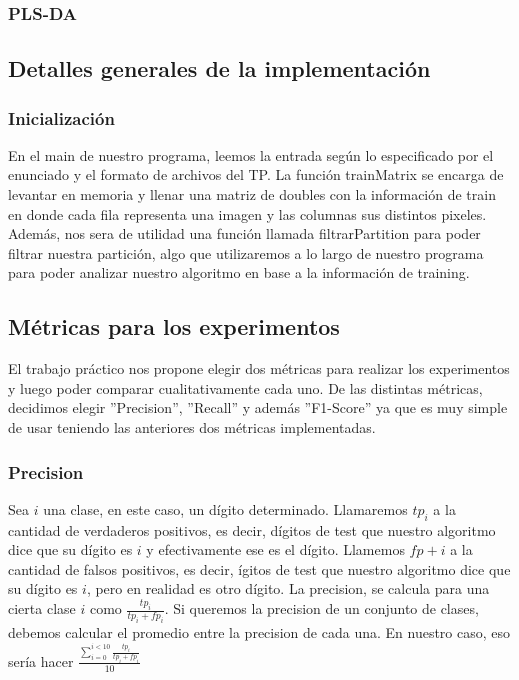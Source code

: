 \subsubsection{PLS-DA}

\subsection{Detalles generales de la implementaci\'on}

\subsubsection{Inicializaci\'on}

En el main de nuestro programa, leemos la entrada seg\'un lo especificado por el enunciado y el formato de archivos del TP. La funci\'on trainMatrix se encarga de levantar en memoria y llenar una matriz de doubles con la informaci\'on de train en donde cada fila representa una imagen y las columnas sus distintos pixeles. Adem\'as, nos sera de utilidad una funci\'on llamada filtrarPartition para poder filtrar nuestra partici\'on, algo que utilizaremos a lo largo de nuestro programa para poder analizar nuestro algoritmo en base a la informaci\'on de training.

\subsection{M\'etricas para los experimentos}

El trabajo pr\'actico nos propone elegir dos m\'etricas para realizar los experimentos y luego poder comparar cualitativamente cada uno. De las distintas m\'etricas, decidimos elegir ''Precision'', ''Recall'' y adem\'as ''F1-Score'' ya que es muy simple de usar teniendo las anteriores dos m\'etricas implementadas.

\subsubsection{Precision}

Sea $i$ una clase, en este caso, un d\'igito determinado. Llamaremos $tp_i$ a la cantidad de verdaderos positivos, es decir, d\'igitos de test que nuestro algoritmo dice que su d\'igito es $i$ y efectivamente ese es el d\'igito. Llamemos $fp+i$ a la cantidad de falsos positivos, es decir, \'igitos de test que nuestro algoritmo dice que su d\'igito es $i$, pero en realidad es otro d\'igito. La precision, se calcula para una cierta clase $i$ como $\frac{tp_i}{tp_i+fp_i}$. Si queremos la precision de un conjunto de clases, debemos calcular el promedio entre la precision de cada una. En nuestro caso, eso ser\'ia hacer $\frac{\sum_{i=0}^{i<10} \frac{tp_i}{tp_i+fp_i}}{10} $\\

